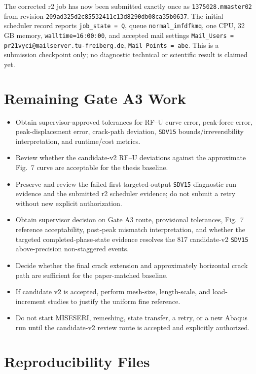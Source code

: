 \documentclass[11pt,a4paper]{article}
\begin{document}
The corrected r2 job has now been submitted exactly once as \texttt{1375028.mmaster02} from revision \texttt{209ad325d2c85532411c13d8290db08ca35b0637}. The initial scheduler record reports \texttt{job\_state = Q}, queue \texttt{normal\_imfdfkmq}, one CPU, 32 GB memory, \texttt{walltime=16:00:00}, and accepted mail settings \texttt{Mail\_Users = pr21vyci@mailserver.tu-freiberg.de}, \texttt{Mail\_Points = abe}. This is a submission checkpoint only; no diagnostic technical or scientific result is claimed yet.

\section{Remaining Gate A3 Work}

\begin{itemize}
  \item Obtain supervisor-approved tolerances for RF--U curve error, peak-force error, peak-displacement error, crack-path deviation, \texttt{SDV15} bounds/irreversibility interpretation, and runtime/cost metrics.
  \item Review whether the candidate-v2 RF--U deviations against the approximate Fig.~7 curve are acceptable for the thesis baseline.
  \item Preserve and review the failed first targeted-output \texttt{SDV15} diagnostic run evidence and the submitted r2 scheduler evidence; do not submit a retry without new explicit authorization.
  \item Obtain supervisor decision on Gate A3 route, provisional tolerances, Fig.~7 reference acceptability, post-peak mismatch interpretation, and whether the targeted completed-phase-state evidence resolves the 817 candidate-v2 \texttt{SDV15} above-precision non-staggered events.
  \item Decide whether the final crack extension and approximately horizontal crack path are sufficient for the paper-matched baseline.
  \item If candidate v2 is accepted, perform mesh-size, length-scale, and load-increment studies to justify the uniform fine reference.
  \item Do not start MISESERI, remeshing, state transfer, a retry, or a new Abaqus run until the candidate-v2 review route is accepted and explicitly authorized.
\end{itemize}

\section*{Reproducibility Files}
\end{document}
